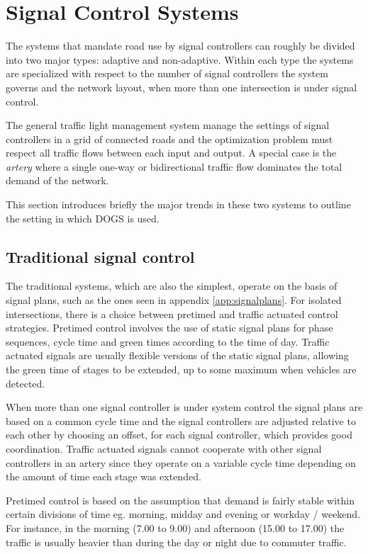 \section{Signal Control Systems}
\label{systems}
The systems that mandate road use by signal controllers can roughly be divided into two major types: adaptive and non-adaptive. Within each type the systems are specialized with respect to the number of signal controllers the system governs and the network layout, when more than one intersection is under signal control. 

The general traffic light management system manage the settings of signal controllers in a grid of connected roads and the optimization problem must respect all traffic flows between each input and output. A special case is the \textit{artery} where a single one-way or bidirectional traffic flow dominates the total demand of the network.

This section introduces briefly the major trends in these two systems to outline the setting in which DOGS is used.

\subsection{Traditional signal control}

The traditional systems, which are also the simplest, operate on the basis of signal plans, such as the ones seen in appendix \ref{app:signalplans}. For isolated intersections, there is a choice between pretimed and traffic actuated control strategies. Pretimed control involves the use of static signal plans for phase sequences, cycle time and green times according to the time of day. Traffic actuated signals are usually flexible versions of the static signal plans, allowing the green time of stages to be extended, up to some maximum when vehicles are detected.

When more than one signal controller is under system control the signal plans are based on a common cycle time and the signal controllers are adjusted relative to each other by choosing an offset, for each signal controller, which provides good coordination. Traffic actuated signals cannot cooperate with other signal controllers in an artery since they operate on a variable cycle time depending on the amount of time each stage was extended.

Pretimed control is based on the assumption that demand is fairly stable within certain divisions of time eg. morning, midday and evening or workday / weekend. For instance, in the morning (7.00 to 9.00) and afternoon (15.00 to 17.00) the traffic is usually heavier than during the day or night due to  commuter traffic.

